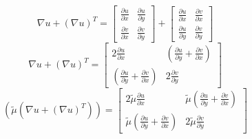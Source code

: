 \begin{equation*}
 \nabla u + (\nabla u)^T=  \begin{bmatrix} \frac{\partial u}{\partial x} & \frac{\partial u}{\partial y} \\ \frac{\partial v}{\partial x} & \frac{\partial v}{\partial y}  \end{bmatrix}
 + \begin{bmatrix} \frac{\partial u}{\partial x} & \frac{\partial v}{\partial x} \\ \frac{\partial u}{\partial y} & \frac{\partial v}{\partial y}  \end{bmatrix}
\end{equation*}
\begin{equation*}
 \nabla u + (\nabla u)^T=  \begin{bmatrix} 2\frac{\partial u}{\partial x} & \left(\frac{\partial u}{\partial y}+\frac{\partial v}{\partial x}\right) \\ 
 \left(\frac{\partial u}{\partial y}+\frac{\partial v}{\partial x}\right) & 2\frac{\partial v}{\partial y}  \end{bmatrix}
\end{equation*}
\begin{equation*}
 (\tilde\mu (\nabla  u + (\nabla  u)^T)) = \begin{bmatrix} 2\tilde\mu\frac{\partial u}{\partial x} & \tilde\mu\left(\frac{\partial u}{\partial y}+\frac{\partial v}{\partial x}\right) \\ 
 \tilde\mu\left(\frac{\partial u}{\partial y}+\frac{\partial v}{\partial x}\right) & 2\tilde\mu\frac{\partial v}{\partial y}  \end{bmatrix}
\end{equation*}

